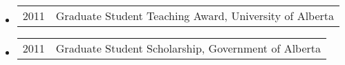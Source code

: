\begin{itemize}
\item \begin{tabular}{ll}
2011 & Graduate Student Teaching Award, University of Alberta \\
\end{tabular}

\item \begin{tabular}{ll}
2011 & Graduate Student Scholarship, Government of Alberta \\
\end{tabular}

%
%
%
%
%
%
%
%

\end{itemize}


